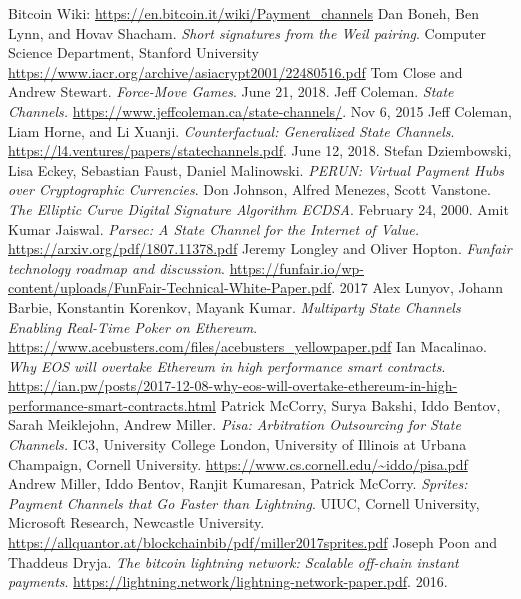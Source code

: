 \documentclass[tikz, 12pt]{article}
\theoremstyle{definition}
\theoremstyle{remark}
\begin{document}

	\begin{thebibliography}{9}
 Bitcoin Wiki: \url{https://en.bitcoin.it/wiki/Payment_channels}
 Dan Boneh, Ben Lynn, and Hovav Shacham. \emph{Short signatures from the Weil pairing}. Computer Science Department, Stanford University \url{https://www.iacr.org/archive/asiacrypt2001/22480516.pdf}
 Tom Close and Andrew Stewart. \emph{Force-Move Games}. June 21, 2018.
 Jeff Coleman. \emph{State Channels.} \url{https://www.jeffcoleman.ca/state-channels/}. Nov 6, 2015
 Jeff Coleman, Liam Horne, and Li Xuanji. \emph{Counterfactual: Generalized State Channels}. \url{https://l4.ventures/papers/statechannels.pdf}. June 12, 2018.
 Stefan Dziembowski, Lisa Eckey, Sebastian Faust, Daniel Malinowski. \emph{PERUN: Virtual Payment Hubs over Cryptographic Currencies}.
 Don Johnson, Alfred Menezes, Scott Vanstone. \emph{The Elliptic Curve Digital Signature Algorithm ECDSA}. February 24, 2000.
 Amit Kumar Jaiswal. \emph{Parsec: A State Channel for the Internet of Value.} \url{https://arxiv.org/pdf/1807.11378.pdf}
 Jeremy Longley and Oliver Hopton. \emph{Funfair technology roadmap and discussion}. \url{https://funfair.io/wp-content/uploads/FunFair-Technical-White-Paper.pdf}. 2017
 Alex Lunyov, Johann Barbie, Konstantin Korenkov, Mayank Kumar. \emph{Multiparty State Channels Enabling Real-Time Poker on Ethereum}. \url{https://www.acebusters.com/files/acebusters_yellowpaper.pdf}
 Ian Macalinao. \emph{Why EOS will overtake Ethereum in high performance smart contracts}. \url{https://ian.pw/posts/2017-12-08-why-eos-will-overtake-ethereum-in-high-performance-smart-contracts.html}
 Patrick McCorry, Surya Bakshi, Iddo Bentov, Sarah Meiklejohn, Andrew Miller. \emph{Pisa: Arbitration Outsourcing for State Channels.} IC3, University College London, University of Illinois at Urbana Champaign, Cornell University. \url{https://www.cs.cornell.edu/~iddo/pisa.pdf}
 Andrew Miller, Iddo Bentov, Ranjit Kumaresan, Patrick McCorry. \emph{Sprites: Payment Channels that Go Faster than Lightning}. UIUC, Cornell University, Microsoft Research, Newcastle University. \url{https://allquantor.at/blockchainbib/pdf/miller2017sprites.pdf}
 Joseph Poon and Thaddeus Dryja. \emph{The bitcoin lightning network: Scalable off-chain instant payments}. \url{https://lightning.network/lightning-network-paper.pdf}. 2016.

\end{thebibliography}
\end{document}
